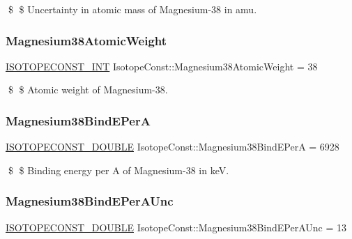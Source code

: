 \$ \$ Uncertainty in atomic mass of Magnesium-\/38 in amu. \mbox{\label{group___isotope_const-_magnesium-_mg38_gaefab1b52ae008b136a79d061c137bbfd}} 
\subsubsection{\texorpdfstring{Magnesium38\+Atomic\+Weight}{Magnesium38AtomicWeight}}
{\footnotesize\ttfamily \mbox{\hyperlink{group___isotope_const-_macros_ga5f18360b3e99483a35c32d789e62621c}{I\+S\+O\+T\+O\+P\+E\+C\+O\+N\+S\+T\+\_\+\+I\+NT}} Isotope\+Const\+::\+Magnesium38\+Atomic\+Weight = 38}

\$ \$ Atomic weight of Magnesium-\/38. \mbox{\label{group___isotope_const-_magnesium-_mg38_ga3ef25c98b0a0ca3d84de41a20c429c5b}} 
\subsubsection{\texorpdfstring{Magnesium38\+Bind\+E\+PerA}{Magnesium38BindEPerA}}
{\footnotesize\ttfamily \mbox{\hyperlink{group___isotope_const-_macros_ga8f45a7272ce02c0b4c65c44636ed719a}{I\+S\+O\+T\+O\+P\+E\+C\+O\+N\+S\+T\+\_\+\+D\+O\+U\+B\+LE}} Isotope\+Const\+::\+Magnesium38\+Bind\+E\+PerA = 6928}

\$ \$ Binding energy per A of Magnesium-\/38 in keV. \mbox{\label{group___isotope_const-_magnesium-_mg38_ga3dbc4647a0c6fe64313a38e09dd01da0}} 
\subsubsection{\texorpdfstring{Magnesium38\+Bind\+E\+Per\+A\+Unc}{Magnesium38BindEPerAUnc}}
{\footnotesize\ttfamily \mbox{\hyperlink{group___isotope_const-_macros_ga8f45a7272ce02c0b4c65c44636ed719a}{I\+S\+O\+T\+O\+P\+E\+C\+O\+N\+S\+T\+\_\+\+D\+O\+U\+B\+LE}} Isotope\+Const\+::\+Magnesium38\+Bind\+E\+Per\+A\+Unc = 13}

